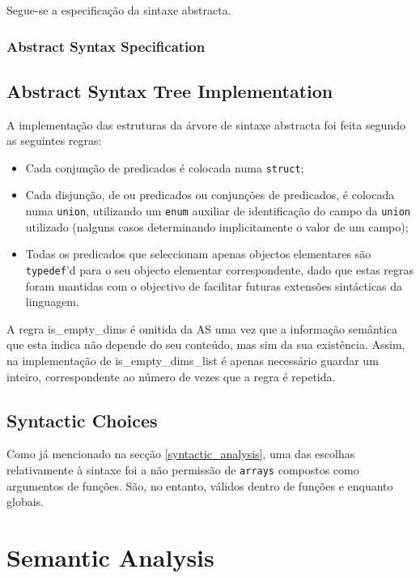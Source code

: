 \documentclass[a4paper]{article}
\begin{document}
Segue-se a especificação da sintaxe abstracta.

\cleardoublepage

\subsubsection{Abstract Syntax Specification}


\cleardoublepage

\subsection{Abstract Syntax Tree Implementation}
A implementação das estruturas da árvore de sintaxe abstracta foi feita segundo as seguintes regras:
\begin{itemize}
	\item Cada conjunção de predicados é colocada numa \texttt{struct};
	\item Cada disjunção, de ou predicados ou conjunções de predicados, é colocada numa \texttt{union},
		utilizando um \texttt{enum} auxiliar de identificação do campo da \texttt{union} utilizado
		(nalguns casos determinando implicitamente o valor de um campo);
	\item Todas os predicados que seleccionam apenas objectos elementares são \texttt{typedef}'d para o seu objecto elementar correspondente,
		dado que estas regras foram mantidas com o objectivo de facilitar futuras extensões sintácticas da linguagem.
\end{itemize}

A regra is\_empty\_dims é omitida da AS uma vez que a informação semântica que esta indica não depende do seu conteúdo, mas sim da sua existência.
Assim, na implementação de is\_empty\_dims\_list é apenas necessário guardar um inteiro, correspondente ao número de vezes que a regra é repetida.

\subsection{Syntactic Choices}
\indent \indent Como já mencionado na secção \ref{syntactic_analysis}, uma das escolhas relativamente à sintaxe foi a não permissão de \texttt{arrays} compostos
como argumentos de funções. São, no entanto, válidos dentro de funções e enquanto globais.

\cleardoublepage

\section{Semantic Analysis}
\end{document}

